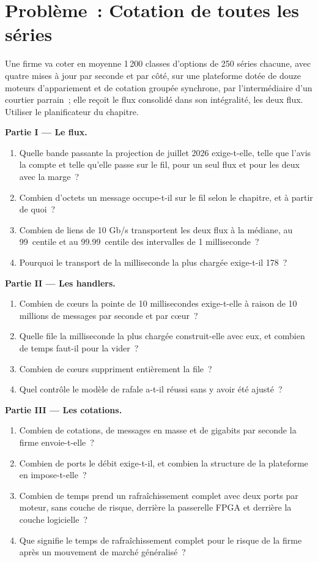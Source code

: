 \section{Problème~: Cotation de toutes les séries}

\begin{problem}\label{pb:nw:equities-and-options-connectivity:1}
Une firme va coter en moyenne 1\,200 classes d'options de 250 séries chacune, avec quatre mises à jour par seconde et par côté, sur une plateforme dotée de douze
moteurs d'appariement et de cotation groupée synchrone, par l'intermédiaire d'un courtier parrain~; elle reçoit le flux consolidé dans son intégralité, les deux flux. Utiliser le
planificateur du chapitre.

\medskip\noindent\textbf{Partie I --- Le flux.}
\begin{enumerate}
\item Quelle bande passante la projection de juillet 2026 exige-t-elle, telle que l'avis la compte et telle qu'elle passe sur le fil, pour un seul flux et pour les deux avec la
  marge~?
\item Combien d'octets un message occupe-t-il sur le fil selon le chapitre, et à partir de quoi~?
\item Combien de liens de 10 Gb/s transportent les deux flux à la médiane, au 99~centile et au 99.99~centile des intervalles de 1 milliseconde~?
\item Pourquoi le transport de la milliseconde la plus chargée exige-t-il 178~?
\end{enumerate}

\medskip\noindent\textbf{Partie II --- Les handlers.}
\begin{enumerate}[resume]
\item Combien de cœurs la pointe de 10 millisecondes exige-t-elle à raison de 10 millions de messages par seconde et par cœur~?
\item Quelle file la milliseconde la plus chargée construit-elle avec eux, et combien de temps faut-il pour la vider~?
\item Combien de cœurs suppriment entièrement la file~?
\item Quel contrôle le modèle de rafale a-t-il réussi sans y avoir été ajusté~?
\end{enumerate}

\medskip\noindent\textbf{Partie III --- Les cotations.}
\begin{enumerate}[resume]
\item Combien de cotations, de messages en masse et de gigabits par seconde la firme envoie-t-elle~?
\item Combien de ports le débit exige-t-il, et combien la structure de la plateforme en impose-t-elle~?
\item Combien de temps prend un rafraîchissement complet avec deux ports par moteur, sans couche de risque, derrière la passerelle FPGA et derrière la
  couche logicielle~?
\item Que signifie le temps de rafraîchissement complet pour le risque de la firme après un mouvement de marché généralisé~?
\end{enumerate}


\end{problem}
